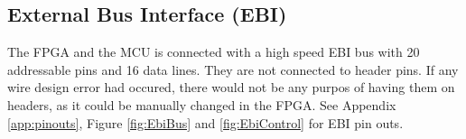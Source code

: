 \subsection{External Bus Interface (EBI)}
The FPGA and the MCU is connected with a high speed EBI bus with 20 addressable pins and 16 data lines. They are not connected to header pins. If any wire design error had occured, there would not be any purpos of having them on headers, as it could be manually changed in the FPGA.
See Appendix \ref{app:pinouts}, Figure \ref{fig:EbiBus} and \ref{fig:EbiControl} for EBI pin outs.

